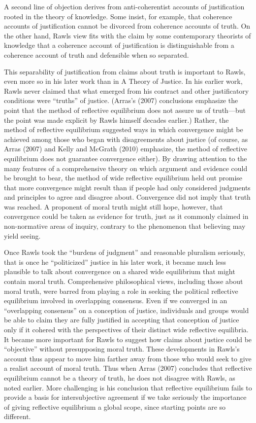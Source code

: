 \documentclass[]{article}
\begin{document}
A second line of objection derives from anti-coherentist accounts of
justification rooted in the theory of knowledge. Some insist, for
example, that coherence accounts of justification cannot be divorced
from coherence accounts of truth. On the other hand, Rawls view fits
with the claim by some contemporary theorists of knowledge that a
coherence account of justification is distinguishable from a coherence
account of truth and defensible when so separated.

This separability of justification from claims about truth is important
to Rawls, even more so in his later work than in A Theory of Justice. In
his earlier work, Rawls never claimed that what emerged from his
contract and other justificatory conditions were ``truths'' of justice.
(Arras's (2007) conclusions emphasize the point that the method of
reflective equilibrium does not assure us of truth---but the point was
made explicit by Rawls himself decades earlier.) Rather, the method of
reflective equilibrium suggested ways in which convergence might be
achieved among those who began with disagreements about justice (of
course, as Arras (2007) and Kelly and McGrath (2010) emphasize, the
method of reflective equilibrium does not guarantee convergence either).
By drawing attention to the many features of a comprehensive theory on
which argument and evidence could be brought to bear, the method of wide
reflective equilibrium held out promise that more convergence might
result than if people had only considered judgments and principles to
agree and disagree about. Convergence did not imply that truth was
reached. A proponent of moral truth might still hope, however, that
convergence could be taken as evidence for truth, just as it commonly
claimed in non-normative areas of inquiry, contrary to the phenomenon
that believing may yield seeing.

Once Rawls took the ``burdens of judgment'' and reasonable pluralism
seriously, that is once he ``politicized'' justice in his later work, it
became much less plausible to talk about convergence on a shared wide
equilibrium that might contain moral truth. Comprehensive philosophical
views, including those about moral truth, were barred from playing a
role in seeking the political reflective equilibrium involved in
overlapping consensus. Even if we converged in an ``overlapping
consensus'' on a conception of justice, individuals and groups would be
able to claim they are fully justified in accepting that conception of
justice only if it cohered with the perspectives of their distinct wide
reflective equilibria. It became more important for Rawls to suggest how
claims about justice could be ``objective'' without presupposing moral
truth. These developments in Rawls's account thus appear to move him
farther away from those who would seek to give a realist account of
moral truth. Thus when Arras (2007) concludes that reflective
equilibrium cannot be a theory of truth, he does not disagree with
Rawls, as noted earlier. More challenging is his conclusion that
reflective equilibrium fails to provide a basis for intersubjective
agreement if we take seriously the importance of giving reflective
equilibrium a global scope, since starting points are so different.
\end{document}
